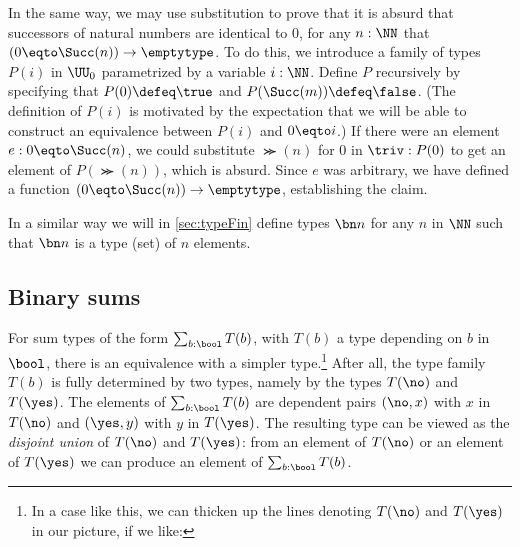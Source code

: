 In the same way, we may use substitution to prove that it is absurd
that successors of natural numbers are identical to $0$,
\ie for any $n:\NN$ that $(0 \eqto \Succ(n))\to \emptytype$.
To do this, we introduce a family of types $P(i)$ in $\UU_0$ parametrized
by a variable $i:\NN$.  Define $P$ recursively by
specifying that $P(0) \defeq \true$ and $P(\Succ(m)) \defeq \false$.  (The definition of $P(i)$ is motivated by the expectation that we will be
able to construct an equivalence between $P(i)$ and $0 \eqto i$.)  If there were an element $e: 0 \eqto \Succ(n)$, we could substitute $\Succ(n)$ for $0$
in $\triv : P ( 0 )$ to get an element of $P(\Succ(n))$, which is absurd.  Since $e$ was arbitrary, we have defined a function $(0 \eqto \Succ(n)) \to \emptytype$,
establishing the claim.

In a similar way we will in \cref{sec:typeFin} define types $\bn n$ for any $n$ in $\NN$
such that $\bn n$ is a type (set) of $n$ elements.


\subsection{Binary sums}
\label{sec:binsum-types}
For sum types of the form $\sum_{b:\bool} T(b)$, with $T(b)$
a type depending on $b$ in $\bool$, there is an equivalence with a simpler type.\footnote{%
  In a case like this, we can thicken up the lines denoting
  $T(\no)$ and $T(\yes)$ in our picture, if we like:\par
  }
After all, the type family $T(b)$ is fully determined
by two types, namely by the types $T(\no)$ and $T(\yes)$.
The elements of $\sum_{b:\bool} T(b)$ are dependent pairs $(\no,x)$ with
$x$ in $T(\no)$ and $(\yes,y)$ with $y$ in $T(\yes)$. The resulting
type can be viewed as the \emph{disjoint union} of $T(\no)$ and $T(\yes)$:
from an element of $T(\no)$ or an element of $T(\yes)$
we can produce an element of $\sum_{b:\bool} T(b)$.

